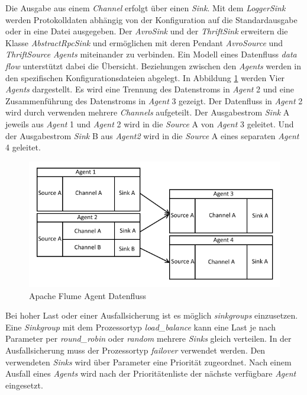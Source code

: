 Die Ausgabe aus einem \textit{Channel} erfolgt über einen \textit{Sink}. Mit dem \textit{LoggerSink} werden Protokolldaten abhängig von der Konfiguration auf die Standardausgabe oder in eine Datei ausgegeben. Der \textit{AvroSink}  und der \textit{ThriftSink}  erweitern die Klasse \textit{AbstractRpcSink}  und ermöglichen mit deren Pendant \textit{AvroSource} und \textit{ThriftSource} \textit{Agents} miteinander zu verbinden. Ein Modell eines Datenfluss \textit{data flow} unterstützt dabei die Übersicht. Beziehungen zwischen den \textit{Agents} werden in den spezifischen Konfigurationsdateien abgelegt. In Abbildung \ref{fig:flumeAgentChaining} werden Vier \textit{Agents} dargestellt. Es wird eine Trennung des Datenstroms in \textit{Agent} 2 und eine Zusammenführung des Datenstroms in \textit{Agent} 3 gezeigt. Der Datenfluss in \textit{Agent} 2 wird durch verwenden mehrere \textit{Channels} aufgeteilt. Der Ausgabestrom \textit{Sink} A jeweils aus \textit{Agent} 1 und \textit{Agent} 2 wird in die \textit{Source} A von \textit{Agent} 3 geleitet. Und der Ausgabestrom \textit{Sink} B aus \textit{Agent2} wird in die \textit{Source} A eines separaten \textit{Agent} 4 geleitet.

\begin{figure}[htb!]
\centering
\includegraphics[width=1.0\textwidth]{bilder/flumeAgentChaining.png}
\caption{Apache Flume Agent Datenfluss
\label{fig:flumeAgentChaining}}
\end{figure}

Bei hoher Last oder einer Ausfallsicherung ist es möglich \textit{sinkgroups} einzusetzen. Eine \textit{Sinkgroup} mit dem Prozessortyp \textit{load\_balance} kann eine Last je nach Parameter per \textit{round\_robin} oder \textit{random} mehrere \textit{Sinks} gleich verteilen. In der Ausfallsicherung muss der Prozessortyp \textit{failover} verwendet werden. Den verwendeten \textit{Sinks} wird über Parameter eine Priorität zugeordnet. Nach einem Ausfall eines \textit{Agents} wird nach der Prioritätenliste der nächste verfügbare \textit{Agent} eingesetzt. 

